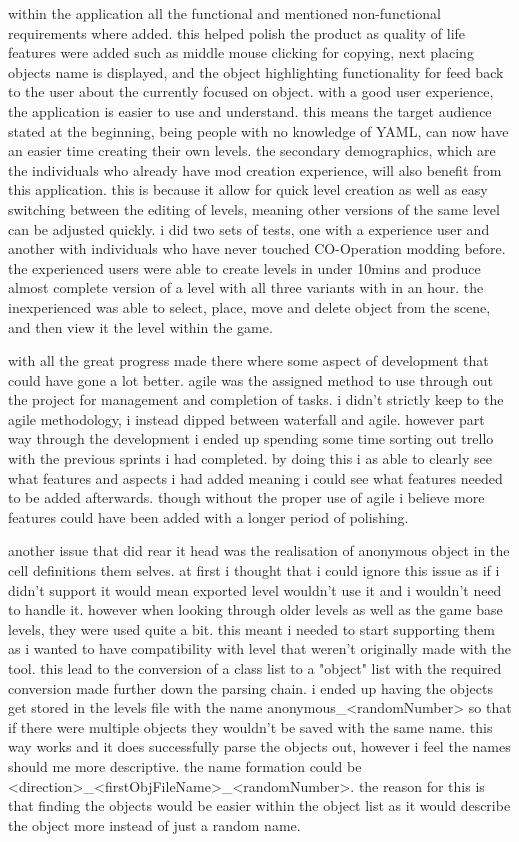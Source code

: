 within the application all the functional and mentioned non-functional requirements where added. this helped polish the product as quality of life features were added such as middle mouse clicking for copying, next placing objects name is displayed, and the object highlighting functionality for feed back to the user about the currently focused on object. with a good user experience, the application is easier to use and understand. this means the target audience stated at the beginning, being people with no knowledge of YAML, can now have an easier time creating their own levels. the secondary demographics, which are the individuals who already have mod creation experience, will also benefit from this application. this is because it allow for quick level creation as well as easy switching between the editing of levels, meaning other versions of the same level can be adjusted quickly. i did two sets of tests, one with a experience user and another with individuals who have never touched CO-Operation modding before. the experienced users were able to create levels in under 10mins and produce almost complete version of a level with all three variants with in an hour. the inexperienced was able to select, place, move and delete object from the scene, and then view it the level within the game.

with all the great progress made there where some aspect of development that could have gone a lot better. agile was the assigned method to use through out the project for management and completion of tasks. i didn't strictly keep to the agile methodology, i instead dipped between waterfall and agile. however part way through the development i ended up spending some time sorting out trello with the previous sprints i had completed. by doing this i as able to clearly see what features and aspects i had added meaning i could see what features needed to be added afterwards. though without the proper use of agile i believe more features could have been added with a longer period of polishing.

another issue that did rear it head was the realisation of anonymous object in the cell definitions them selves. at first i thought that i could ignore this issue as if i didn't support it would mean exported level wouldn't use it and i wouldn't need to handle it. however when looking through older levels as well as the game base levels, they were used quite a bit. this meant i needed to start supporting them as i wanted to have compatibility with level that weren't originally made with the tool. this lead to the conversion of a class list to a "object" list with the required conversion made further down the parsing chain. i ended up having the objects get stored in the levels file with the name anonymous\_<randomNumber> so that if there were multiple objects they wouldn't be saved with the same name. this way works and it does successfully parse the objects out, however i feel the names should me more descriptive. the name formation could be <direction>\_<firstObjFileName>\_<randomNumber>. the reason for this is that finding the objects would be easier within the object list as it would describe the object more instead of just a random name.


